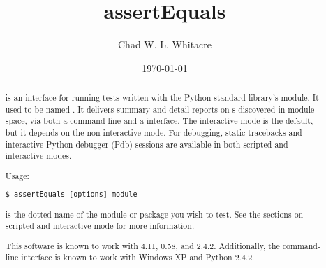 \documentclass{manual}
\title{assertEquals}
\author{Chad W. L. Whitacre}
\date{\today}
\begin{document}
\maketitle

\begin{abstract}

\noindent

 is an interface for running tests written with the
Python standard library's  module. It used to be named
.
It delivers summary and detail reports on s discovered in
module-space, via both a command-line and a  interface. The
interactive mode is the default, but it depends on the non-interactive mode.
For debugging, static tracebacks and interactive Python debugger (Pdb) sessions
are available in both scripted and interactive modes.

Usage:

\begin{verbatim}
$ assertEquals [options] module
\end{verbatim}

 is the dotted name of the module or package you wish to test. See
the sections on scripted and interactive mode for more information.

This software is known to work with 
4.11,  0.58,
and  2.4.2. Additionally, the command-line
interface is known to work with Windows XP and Python 2.4.2.


\end{abstract}




\end{document}
